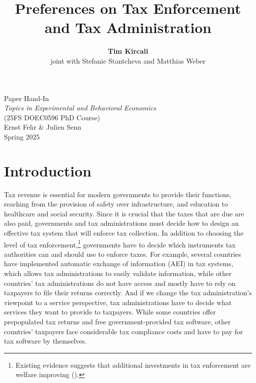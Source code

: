 \documentclass[11pt]{article}
\title{\vspace{2cm}\textbf{Preferences on Tax Enforcement and Tax Administration} \vspace{2cm}}
\author{\textbf{Tim Kircali} \\ joint with Stefanie Stantcheva and Matthias Weber}
\date{}
\begin{document}
\maketitle
\thispagestyle{empty}

\vspace{2cm}

\begin{center}
    Paper Hand-In\\
    \vspace{0.5cm}
    \textit{Topics in Experimental and Behavioral Economics} \\
    (25FS DOEC0596 PhD Course) \\
    \vspace{0.5cm}
    Ernst Fehr \& Julien Senn \\
    Spring 2025
\end{center}

\newpage
{}
\section{Introduction}

Tax revenue is essential for modern governments to provide their functions, reaching from the provision of safety over infrastructure, and education to healthcare and social security. Since it is crucial that the taxes that are due are also paid, governments and tax administrations must decide how to design an effective tax system that will enforce tax collection. In addition to choosing the level of tax enforcement,\footnote{Existing evidence suggests that additional investments in tax enforcement are welfare improving (\cite{boning2025welfare}).} governments have to decide which instruments tax authorities can and should use to enforce taxes. For example, several countries have implemented automatic exchange of information (AEI) in tax systems, which allows tax administrations to easily validate information, while other countries' tax administrations do not have access and mostly have to rely on taxpayers to file their returns correctly. And if we change the tax administration's viewpoint to a service perspective, tax administrations have to decide what services they want to provide to taxpayers. While some countries offer prepopulated tax returns and free government-provided tax software, other countries' taxpayers face considerable tax compliance costs and have to pay for tax software by themselves.%
\end{document}
